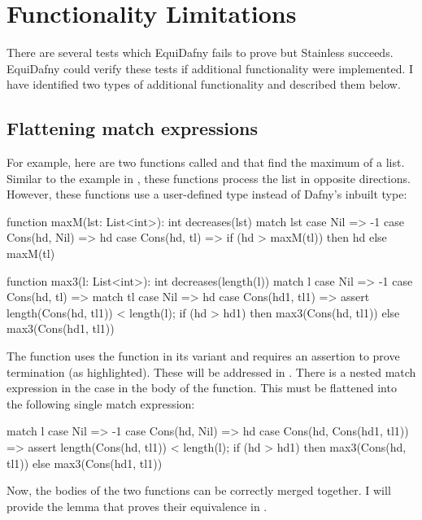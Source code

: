 \section{Functionality Limitations}\label{sec:functional-limitations}

There are several tests which EquiDafny fails to prove but Stainless succeeds. EquiDafny could verify these tests if additional functionality were implemented. I have identified two types of additional functionality and described them below. 

\subsection{Flattening match expressions}\label{sec:match-flattening}

For example, here are two functions called  and  that find the maximum of a list. Similar to the example in , these functions process the list in opposite directions. However, these functions use a user-defined  type instead of Dafny's inbuilt  type:
\begin{dafny}[highlightlines={11,18}]
function maxM(lst: List<int>): int
  decreases(lst) {
  match lst {
    case Nil             => -1
    case Cons(hd, Nil)   => hd
    case Cons(hd, tl)    => if (hd > maxM(tl)) then hd else maxM(tl)
  }
}

function max3(l: List<int>): int
  decreases(length(l)) {
  match l {
    case Nil => -1
    case Cons(hd, tl) =>
      match tl {
        case Nil => hd
        case Cons(hd1, tl1) =>
          assert length(Cons(hd, tl1)) < length(l);
          if (hd > hd1) then max3(Cons(hd, tl1)) else max3(Cons(hd1, tl1))
      }
  }
}
\end{dafny}
%
The  function uses the  function in its variant and requires an assertion to prove termination (as highlighted). These will be addressed in . There is a nested match expression in the  case in the body of the  function. This must be flattened into the following single match expression:
\begin{dafny}
match l {
  case Nil => -1
  case Cons(hd, Nil) => hd
  case Cons(hd, Cons(hd1, tl1)) => 
    assert length(Cons(hd, tl1)) < length(l);
    if (hd > hd1) then max3(Cons(hd, tl1)) else max3(Cons(hd1, tl1))
}
\end{dafny}
%
Now, the bodies of the two functions can be correctly merged together. I will provide the lemma that proves their equivalence in . 


